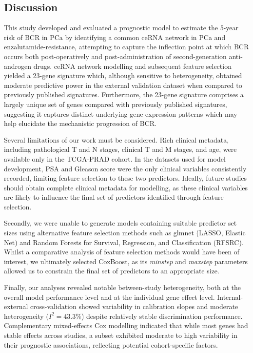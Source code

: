 \subsection{Discussion}\label{sec12}
This study developed and evaluated a prognostic model to estimate the 5-year risk of BCR in PCa by identifying a common ceRNA network in PCa and enzalutamide-resistance, attempting to capture the inflection point at which BCR occurs both post-operatively and post-administration of second-generation anti-androgen drugs. ceRNA network modelling and subsequent feature selection yielded a 23-gene signature which, although sensitive to heterogeneity, obtained moderate predictive power in the external validation dataset when compared to previously published signatures. Furthermore, the 23-gene signature comprises a largely unique set of genes compared with previously published signatures, suggesting it captures distinct underlying gene expression patterns which may help elucidate the mechanistic progression of BCR.

\par

Several limitations of our work must be considered. Rich clinical metadata, including pathological T and N stages, clinical T and M stages, and age, were available only in the TCGA-PRAD cohort. In the datasets used for model development, PSA and Gleason score were the only clinical variables consistently recorded, limiting feature selection to these two predictors. Ideally, future studies should obtain complete clinical metadata for modelling, as these clinical variables are likely to influence the final set of predictors identified through feature selection.  

\par

Secondly, we were unable to generate models containing suitable predictor set sizes using alternative feature selection methods such as glmnet (LASSO, Elastic Net) and Random Forests for Survival, Regression, and Classification (RFSRC). Whilst a comparative analysis of feature selection methods would have been of interest, we ultimately selected CoxBoost, as its \textit{minstep} and \textit{maxstep} parameters allowed us to constrain the final set of predictors to an appropriate size. 

\par

Finally, our analyses revealed notable between-study heterogeneity, both at the overall model performance level and at the individual gene effect level. Internal-external cross-validation showed variability in calibration slopes and moderate heterogeneity ($I^2 = 43.3\%$) despite relatively stable discrimination performance. Complementary mixed-effects Cox modelling indicated that while most genes had stable effects across studies, a subset exhibited moderate to high variability in their prognostic associations, reflecting potential cohort-specific factors.

